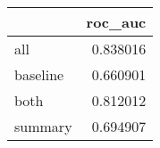 \begin{tabular}{lr}
\toprule
{} &   roc\_auc \\
\midrule
all      &  0.838016 \\
baseline &  0.660901 \\
both     &  0.812012 \\
summary  &  0.694907 \\
\bottomrule
\end{tabular}
